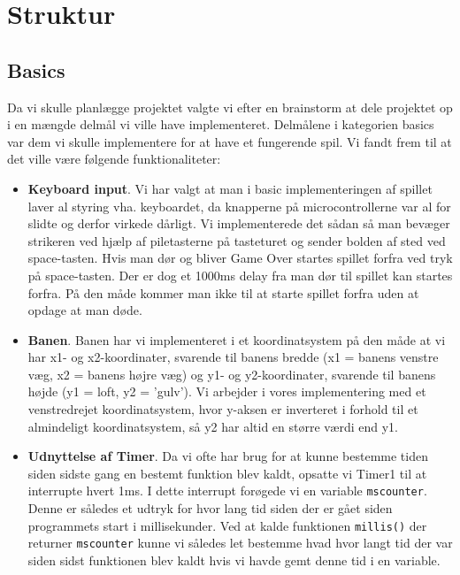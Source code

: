 \chapter{Struktur}

\section{Basics}
Da vi skulle planlægge projektet valgte vi efter en brainstorm at dele projektet op i en mængde delmål vi ville have implementeret. Delmålene i kategorien basics var dem vi skulle implementere for at have et fungerende spil. Vi fandt frem til at det ville være følgende funktionaliteter:
\begin{itemize}

\item \textbf{Keyboard input}. Vi har valgt at man i basic implementeringen af spillet laver al styring vha. keyboardet, da knapperne på microcontrollerne var al for slidte og derfor virkede dårligt. Vi implementerede det sådan så man bevæger strikeren ved hjælp af piletasterne på tasteturet og sender bolden af sted ved space-tasten. Hvis man dør og bliver Game Over startes spillet forfra ved tryk på space-tasten. Der er dog et 1000ms delay fra man dør til spillet kan startes forfra. På den måde kommer man ikke til at starte spillet forfra uden at opdage at man døde.

\item \textbf{Banen}. Banen har vi implementeret i et koordinatsystem på den måde at vi har  x1- og x2-koordinater, svarende til banens bredde (x1 = banens venstre væg, x2 = banens højre væg) og y1- og y2-koordinater, svarende til banens højde (y1 = loft, y2 = 'gulv'). Vi arbejder i vores implementering med et venstredrejet koordinatsystem, hvor y-aksen er inverteret i forhold til et almindeligt koordinatsystem, så y2 har altid en større værdi end y1.

\item \textbf{Udnyttelse af Timer}. Da vi ofte har brug for at kunne bestemme tiden siden sidste gang en bestemt funktion blev kaldt, opsatte vi Timer1 til at interrupte hvert 1ms. I dette interrupt forøgede vi en variable \texttt{mscounter}. Denne er således et udtryk for hvor lang tid siden der er gået siden programmets start i millisekunder. Ved at kalde funktionen \texttt{millis()} der returner \texttt{mscounter} kunne vi således let bestemme hvad hvor langt tid der var siden sidst funktionen blev kaldt hvis vi havde gemt denne tid i en variable.


\end{itemize}
